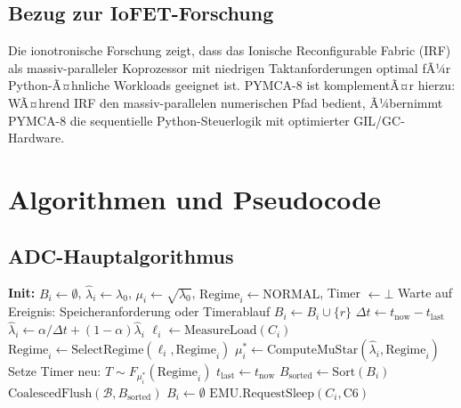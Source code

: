 ﻿\documentclass[a4paper,12pt]{scrreprt}
\theoremstyle{definition}
\begin{document}
	\subsection{Bezug zur IoFET-Forschung}
	
	Die ionotronische Forschung \cite{epp2026iono} zeigt, dass das Ionische
	Reconfigurable Fabric (IRF) als massiv-paralleler Koprozessor mit
	niedrigen Taktanforderungen optimal fÃ¼r Python-Ã¤hnliche Workloads
	geeignet ist. PYMCA-8 ist komplementÃ¤r hierzu: WÃ¤hrend IRF den
	massiv-parallelen numerischen Pfad bedient, Ã¼bernimmt PYMCA-8 die
	sequentielle Python-Steuerlogik mit optimierter GIL/GC-Hardware.
	
	\section{Algorithmen und Pseudocode}
	
	\subsection{ADC-Hauptalgorithmus}
	
	\begin{algorithm}[H]
		\caption{Adaptive Distribution Controller (ADC) -- Kernalgorithmus}
		\label{alg:adc}
		\begin{algorithmic}[1]
			\State \textbf{Init:} $B_i \gets \emptyset$, $\hat\lambda_i \gets \lambda_0$,
			$\mu_i \gets \sqrt{\lambda_0}$, $\mathrm{Regime}_i \gets \mathrm{NORMAL}$,
			Timer $\gets \bot$
			\Repeat
			\State Warte auf Ereignis: Speicheranforderung oder Timerablauf
			\State $B_i \gets B_i \cup \{r\}$
			\State $\Delta t \gets t_{\mathrm{now}} - t_{\mathrm{last}}$
			\State $\hat\lambda_i \gets \alpha / \Delta t + (1-\alpha) \hat\lambda_i$
			\State $\ell_i \gets \mathrm{MeasureLoad}(C_i)$
			\State $\mathrm{Regime}_i \gets \mathrm{SelectRegime}(\ell_i,
			\mathrm{Regime}_i)$
			\State $\mu_i^* \gets \mathrm{ComputeMuStar}(\hat\lambda_i, \mathrm{Regime}_i)$
			\State Setze Timer neu: $T \sim F_{\mu_i^*}(\mathrm{Regime}_i)$
			\State $t_{\mathrm{last}} \gets t_{\mathrm{now}}$
			\State $B_{\mathrm{sorted}} \gets \mathrm{Sort}(B_i)$
			\State $\mathrm{CoalescedFlush}(\mathcal{B}, B_{\mathrm{sorted}})$
			\State $B_i \gets \emptyset$
			\EndIf
			\State $\mathrm{EMU.RequestSleep}(C_i, \mathrm{C6})$
			\EndIf
			\EndIf
		\end{algorithmic}
	\end{algorithm}
\end{document}

